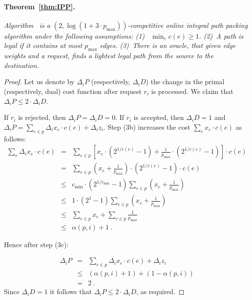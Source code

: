 \documentclass[11pt]{article}
\newcommand{\route}{\text{\sc{ipp}}}
\newcommand{\pmax}{p_{\max}}
\newenvironment{proof sketch}[1]{\noindent {\emph{Proof sketch of #1:}}}{\hfill \qed}
\begin{document}
\paragraph{Theorem~\ref{thm:IPP}.}
\emph{ Algorithm \route\ is a $(2,\log(1+ 3\cdot \pmax))$-competitive online integral
  path packing algorithm under the following assumptions: (1)~ $\min_{e} c(e) \geq
  1$.  (2)~A path is legal if it contains at most $\pmax$ edges.
(3)~There is an oracle, that given edge weights and a
  request, finds a
  lightest legal path from the source to the destination.
}

\begin{proof}Let us denote by $\Delta_i P$ (respectively, $\Delta_i D$) the change in the primal
  (respectively, dual) cost function after request $r_i$ is processed.
We claim that $\Delta_i P\leq 2\cdot \Delta_i D$.

If $r_i$ is rejected, then $\Delta_i P=\Delta_i D=0$.  If $r_i$ is accepted, then
$\Delta_i D = 1$ and $\Delta_i P = \sum_{e \in p} \Delta_i x_{e}\cdot c(e) + \Delta_i
z_{i}$.  Step (3b) increases the cost $\sum_{e} x_{e}\cdot c(e)$ as follows:
    \begin{eqnarray}
    \label{eq:deltax}
    \sum_{e} \Delta_i x_{e}\cdot c(e)
    & = &
    \sum_{e \in p}
    \left[x_{e} \cdot( 2^{1/c(e)}-1)+\frac{1}{\pmax}\cdot (2^{1/c(e)}-1)\right]
    \cdot c(e)  \nonumber\\
    & = &
    \sum_{e\in p} \left(x_{e}+\frac{1}{\pmax}\right) \cdot
    ( 2^{1/c(e)}-1)\cdot c(e)\nonumber\\
    & \leq &
    c_{\min} \cdot (2^{1/c_{\min}}-1)
    \sum_{e\in p} \left(x_{e}+\frac{1}{\pmax}\right)\nonumber\\
    & \leq &
    1 \cdot (2^{1}-1)\sum_{e\in p} \left(x_{e}+\frac{1}{\pmax}\right) \nonumber\\
    & \leq &
    \sum_{e\in p} x_{e}+\sum_{e\in p} \frac{1}{\pmax}\nonumber\\
    & \leq & \alpha(p,i)+1\:.
\end{eqnarray}

Hence after step (3c):

\begin{eqnarray}
    \Delta_i P
    & = & \sum_{e \in p} \Delta_i x_{e}\cdot c(e) + \Delta_i  z_{i}\nonumber\\
    & \leq & (\alpha(p,i) +1) + (1- \alpha(p,i))\nonumber\\
    & = & 2\:.
\end{eqnarray}
Since $\Delta_i D = 1$ it follows that $\Delta_i P \leq 2 \cdot \Delta_i D$, as
required.


\end{proof}
\end{document}
